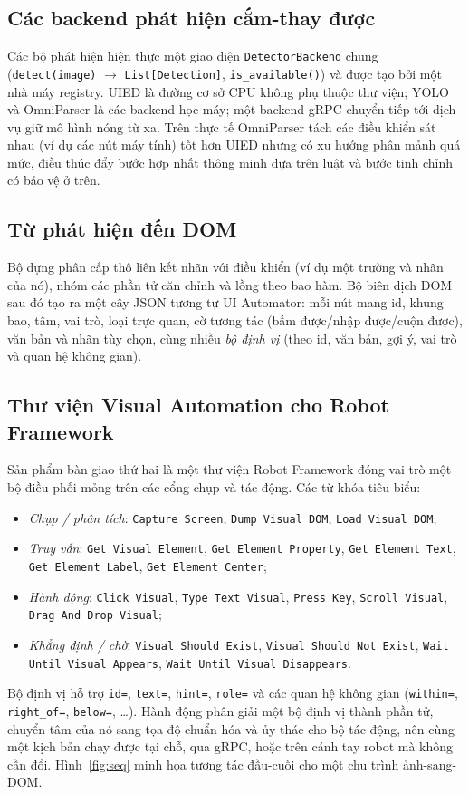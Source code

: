\documentclass[11pt,a4paper]{article}
\newcommand{\code}[1]{\texttt{#1}}
\begin{document}
\subsection{Các backend phát hiện cắm-thay được}
Các bộ phát hiện hiện thực một giao diện \code{DetectorBackend} chung
(\code{detect(image)} $\rightarrow$ \code{List[Detection]}, \code{is\_available()}) và được tạo bởi một
nhà máy registry. UIED là đường cơ sở CPU không phụ thuộc thư viện; YOLO và
OmniParser là các backend học máy; một backend gRPC chuyển tiếp tới dịch vụ giữ mô
hình nóng từ xa. Trên thực tế OmniParser tách các điều khiển sát nhau (ví dụ các nút
máy tính) tốt hơn UIED nhưng có xu hướng phân mảnh quá mức, điều thúc đẩy bước hợp
nhất thông minh dựa trên luật và bước tinh chỉnh có bảo vệ ở trên.

\subsection{Từ phát hiện đến DOM}
Bộ dựng phân cấp thô liên kết nhãn với điều khiển (ví dụ một trường và nhãn của nó),
nhóm các phần tử căn chỉnh và lồng theo bao hàm. Bộ biên dịch DOM sau đó tạo ra một
cây JSON tương tự UI Automator: mỗi nút mang id, khung bao, tâm, vai trò, loại trực
quan, cờ tương tác (bấm được/nhập được/cuộn được), văn bản và nhãn tùy chọn, cùng
nhiều \emph{bộ định vị} (theo id, văn bản, gợi ý, vai trò và quan hệ không gian).

\subsection{Thư viện Visual Automation cho Robot Framework}
Sản phẩm bàn giao thứ hai là một thư viện Robot Framework \cite{robotframework} đóng
vai trò một bộ điều phối mỏng trên các cổng chụp và tác động. Các từ khóa tiêu biểu:
\begin{itemize}[leftmargin=1.4em]
  \item \emph{Chụp / phân tích}: \code{Capture Screen}, \code{Dump Visual DOM},
        \code{Load Visual DOM};
  \item \emph{Truy vấn}: \code{Get Visual Element}, \code{Get Element Property},
        \code{Get Element Text}, \code{Get Element Label}, \code{Get Element Center};
  \item \emph{Hành động}: \code{Click Visual}, \code{Type Text Visual},
        \code{Press Key}, \code{Scroll Visual}, \code{Drag And Drop Visual};
  \item \emph{Khẳng định / chờ}: \code{Visual Should Exist},
        \code{Visual Should Not Exist}, \code{Wait Until Visual Appears},
        \code{Wait Until Visual Disappears}.
\end{itemize}
Bộ định vị hỗ trợ \code{id=}, \code{text=}, \code{hint=}, \code{role=} và các quan
hệ không gian (\code{within=}, \code{right\_of=}, \code{below=}, \dots). Hành động
phân giải một bộ định vị thành phần tử, chuyển tâm của nó sang tọa độ chuẩn hóa và ủy
thác cho bộ tác động, nên cùng một kịch bản chạy được tại chỗ, qua gRPC, hoặc trên
cánh tay robot mà không cần đổi. Hình~\ref{fig:seq} minh họa tương tác đầu-cuối cho
một chu trình ảnh-sang-DOM.
\end{document}
